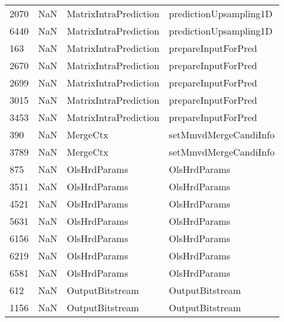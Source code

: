 \begin{tabular}{llll}
2070 &                   NaN &      MatrixIntraPrediction &                    predictionUpsampling1D \\
6440 &                   NaN &      MatrixIntraPrediction &                    predictionUpsampling1D \\
163  &                   NaN &      MatrixIntraPrediction &                       prepareInputForPred \\
2670 &                   NaN &      MatrixIntraPrediction &                       prepareInputForPred \\
2699 &                   NaN &      MatrixIntraPrediction &                       prepareInputForPred \\
3015 &                   NaN &      MatrixIntraPrediction &                       prepareInputForPred \\
3453 &                   NaN &      MatrixIntraPrediction &                       prepareInputForPred \\
390  &                   NaN &                   MergeCtx &                     setMmvdMergeCandiInfo \\
3789 &                   NaN &                   MergeCtx &                     setMmvdMergeCandiInfo \\
875  &                   NaN &               OlsHrdParams &                              OlsHrdParams \\
3511 &                   NaN &               OlsHrdParams &                              OlsHrdParams \\
4521 &                   NaN &               OlsHrdParams &                              OlsHrdParams \\
5631 &                   NaN &               OlsHrdParams &                              OlsHrdParams \\
6156 &                   NaN &               OlsHrdParams &                              OlsHrdParams \\
6219 &                   NaN &               OlsHrdParams &                              OlsHrdParams \\
6581 &                   NaN &               OlsHrdParams &                              OlsHrdParams \\
612  &                   NaN &            OutputBitstream &                           OutputBitstream \\
1156 &                   NaN &            OutputBitstream &                           OutputBitstream \\

\end{tabular}
